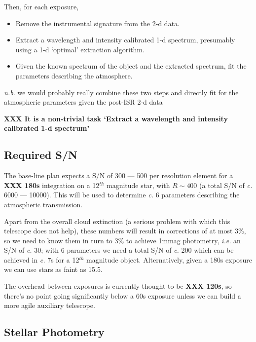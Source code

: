\documentclass[12pt]{article}
\renewcommand{\c}{\textit{c.}\xspace}
\newcommand{\ie}{\textit{i.e.}\xspace}
\newcommand{\nb}{\textit{n.b.}\xspace}
\newcommand{\XXX}[1]{\textbf{XXX #1}\xspace}
\begin{document}
Then, for each exposure,
\begin{itemize}
  \item Remove the instrumental signature from the 2-d data.
  \item Extract a wavelength and intensity calibrated 1-d spectrum, presumably using a 1-d `optimal'
    extraction algorithm.
  \item Given the known spectrum of the object and the extracted spectrum, fit the parameters describing the
    atmosphere.
\end{itemize}
\nb we would probably really combine these two steps and directly fit for the
atmospheric parameters given the post-ISR 2-d data

\XXX{It is a non-trivial task `Extract a wavelength and intensity calibrated 1-d spectrum'}

\subsection{Required S/N}

The base-line plan expects a S/N of 300 --- 500 per resolution element for a \XXX{180s} integration on a
12$^{th}$ magnitude star, with $R \sim 400$ (a total S/N of \c 6000 --- 10000).  This will be used to
determine \c 6 parameters describing the atmospheric transmission.

Apart from the overall cloud extinction (a serious problem with which this telescope does not help), these
numbers will result in corrections of at most 3\%, so we need to know them in turn to 3\% to achieve 1mmag
photometry, \ie an S/N of \c 30; with 6 parameters we need a total S/N of \c 200 which can be achieved in \c
7s for a 12$^{th}$ magnitude object.  Alternatively, given a 180s exposure we can use stars as faint as 15.5.

The overhead between exposures is currently thought to be \XXX{120s}, so there's no point going significantly
below a 60s exposure unless we can build a more agile auxiliary telescope.

\subsection{Stellar Photometry}
\label{secStellarPhotometry}
\end{document}
